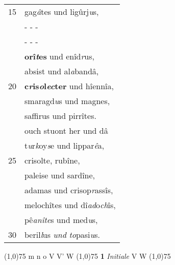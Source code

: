 \documentclass[8pt,a4paper,notitlepage]{article}
\begin{document}
\begin{table}[ht]
\begin{minipage}[t]{0.5\linewidth}
\begin{tabular}{rl}
15 & gag\textit{â}tes und ligûrj\textit{u}s,\\ 
 & \multicolumn{1}{l}{ - - - }\\ 
 & \multicolumn{1}{l}{ - - - }\\ 
 & \textbf{orî\textit{t}es} und enîd\textit{r}us,\\ 
 & absist und al\textit{a}bandâ,\\ 
20 & \textbf{c\textit{r}is\textit{o}l\textit{ec}ter} und hîennîa,\\ 
 & smaragd\textit{u}s und magnes,\\ 
 & saffirus und pirrîtes.\\ 
 & ouch stuont her und dâ\\ 
 & t\textit{u}r\textit{k}oy\textit{s}e und lippar\textit{ê}a,\\ 
25 & crisolte, rubîne,\\ 
 & paleise und sardîne,\\ 
 & adamas und crisop\textit{r}assîs,\\ 
 & melochîtes und dî\textit{ad}o\textit{ch}îs,\\ 
 & pê\textit{anîte}s und med\textit{u}s,\\ 
30 & beril\textit{l}us \textit{und} \textit{to}pasi\textit{u}s.\\ 
\end{tabular}
\scriptsize
\line(1,0){75} \newline
m n o V V' W \newline
\line(1,0){75} \newline
\textbf{1} \textit{Initiale} V W  \newline
\line(1,0){75} \newline

\end{minipage}
\end{table}
\end{document}
